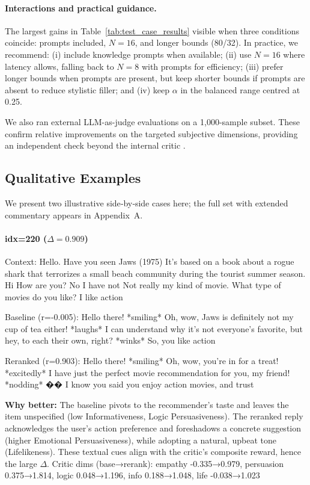 \documentclass[12pt]{article}
\begin{document}
  \paragraph{Interactions and practical guidance.} The largest gains in Table~\ref{tab:test_case_results} visible when three conditions coincide: prompts included, $N=16$, and longer bounds (80/32). In practice, we recommend: (i) include knowledge prompts when available; (ii) use $N=16$ where latency allows, falling back to $N=8$ with prompts for efficiency; (iii) prefer longer bounds when prompts are present, but keep shorter bounds if prompts are absent to reduce stylistic filler; and (iv) keep \(\alpha\) in the balanced range centred at 0.25.
  
  We also ran external LLM-as-judge evaluations on a 1{,}000-sample subset. These confirm relative improvements on the targeted subjective dimensions, providing an independent check beyond the internal critic \citep{yan2023llmjudge}.
  
  \subsection{Qualitative Examples}
  We present two illustrative side‑by‑side cases here; the full set with extended commentary appears in Appendix~A.
  \newline
  \newline
  \paragraph{idx=220 ($\Delta=0.909$)}
  \begin{center}
  \begin{qexample}
  Context: Hello. Have you seen Jaws (1975) It's based on a book about a rogue shark that terrorizes a small beach community during the tourist summer season. Hi How are you? No I have not Not really my kind of movie. What type of movies do you like? I like action

  Baseline (r=-0.005): Hello there! *smiling* Oh, wow, Jaws is definitely not my cup of tea either! *laughs* I can understand why it's not everyone's favorite, but hey, to each their own, right? *winks*  So, you like action

  Reranked (r=0.903): Hello there! *smiling* Oh, wow, you're in for a treat! *excitedly* I have just the perfect movie recommendation for you, my friend! *nodding* ��  I know you said you enjoy action movies, and trust
  \end{qexample}
  \end{center}
  \textbf{Why better:} The baseline pivots to the recommender's taste and leaves the item unspecified (low Informativeness, Logic Persuasiveness). The reranked reply acknowledges the user's action preference and foreshadows a concrete suggestion (higher Emotional Persuasiveness), while adopting a natural, upbeat tone (Lifelikeness). These textual cues align with the critic's composite reward, hence the large \(\Delta\).
  \newline
  Critic dims (base→rerank): empathy -0.335→0.979, persuasion 0.375→1.814, logic 0.048→1.196, info 0.188→1.048, life -0.038→1.023
\end{document}
